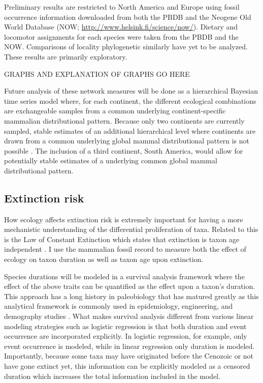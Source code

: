 \documentclass[11pt,letterpaper]{article}
\begin{document}
Preliminary results are restricted to North America and Europe using fossil occurrence information downloaded from both the PBDB and the Neogene Old World Database (NOW; \url{http://www.helsink.fi/science/now/}). Dietary and locomotor assignments for each species were taken from the PBDB and the NOW. Comparisons of locality phylogenetic similarly have yet to be analyzed. These results are primarily exploratory. 

\uppercase{graphs and explanation of graphs go here}

Future analysis of these network measures will be done as a hierarchical Bayesian time series model where, for each continent, the different ecological combinations are exchangeable samples from a common underlying continent-specific mammalian distributional pattern. Because only two continents are currently sampled, stable estimates of an additional hierarchical level where continents are drawn from a common underlying global mammal distributional pattern is not possible \citep{Gelman2013d}. The inclusion of a third continent, South America, would allow for potentially stable estimates of a underlying common global mammal distributional pattern. %

\subsection{Extinction risk}
How ecology affects extinction risk is extremely important for having a more mechanistic understanding of the differential proliferation of taxa. Related to this is the Law of Constant Extinction which states that extinction is taxon age independent \citep{VanValen1973}. I use the mammalian fossil record to measure both the effect of ecology on taxon duration as well as taxon age upon extinction. 

Species durations will be modeled in a survival analysis framework where the effect of the above traits can be quantified as the effect upon a taxon's duration. This approach has a long history in paleobiology \citep{Simpson1944,Simpson1953,VanValen1973,VanValen1979,Baumiller1993,Foote1988} that has matured greatly as this analytical framework is commonly used in epidemiology, engineering, and demography studies \citep{Kleinbaum2005}. What makes survival analysis different from various linear modeling strategies such as logistic regression is that both duration and event occurrence are incorporated explicitly. In logistic regression, for example, only event occurrence is modeled, while in linear regression only duration is modeled. Importantly, because some taxa may have originated before the Cenozoic or not have gone extinct yet, this information can be explicitly modeled as a censored duration which increases the total information included in the model. 
\end{document}
